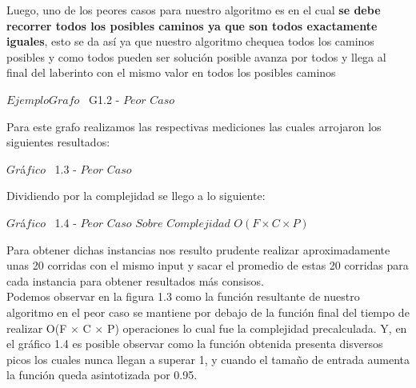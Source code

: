 Luego, uno de los peores casos para nuestro algoritmo es en el cual  \textbf{se debe recorrer todos los posibles caminos ya que son todos exactamente iguales}, esto se da as\'i ya que nuestro algoritmo chequea todos los caminos posibles y como todos pueden ser soluci\'on posible avanza por todos y llega al final del laberinto con el mismo valor en todos los posibles caminos\\

\vspace*{0.3cm} \vspace*{0.3cm}
  \begin{center}
{$Ejemplo Grafo$ \ G1.2 - $Peor$ $Caso$}
  \end{center}
  \vspace*{0.3cm}

Para este grafo realizamos las respectivas mediciones las cuales arrojaron los siguientes resultados:\\


\vspace*{0.3cm} \vspace*{0.3cm}
  \begin{center}
{$Gr$\'a$fico$ \ 1.3 - $Peor$ $Caso$}
  \end{center}
  \vspace*{0.3cm}

Dividiendo por la complejidad se llego a lo siguiente:\\

\vspace*{0.3cm} \vspace*{0.3cm}
  \begin{center}
{$Gr$\'a$fico$ \ 1.4 - $Peor$ $Caso$ $Sobre$ $Complejidad$ $O(F \times C \times P)$}
  \end{center}
  \vspace*{0.3cm}

 Para obtener dichas instancias nos resulto prudente realizar aproximadamente unas 20 corridas con el mismo input y sacar el promedio de estas 20 corridas para cada instancia para obtener resultados m\'as consisos.\\ 

Podemos observar en la figura 1.3 como la funci\'on resultante de nuestro algoritmo en el peor caso se mantiene por debajo de la funci\'on final del tiempo de realizar O(F $\times$ C $\times$ P) operaciones lo cual fue la complejidad precalculada. Y, en el gr\'afico 1.4 es posible observar como la funci\'on obtenida presenta disversos picos los cuales nunca llegan a superar 1, y cuando el tamaño de entrada aumenta la funci\'on queda asintotizada por 0.95.\\


